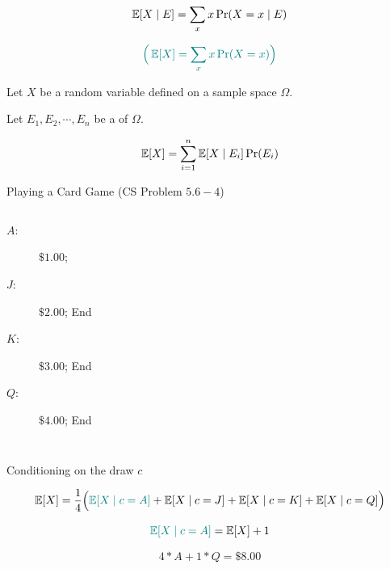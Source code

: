
\begin{frame}{}
  \begin{definition}
    \[
      \operatorname*{\mathbb{E}}[X \mid E] = \sum_{x} x \Pr(X = x \mid E)
    \]

    \[
      \textcolor{teal}{\Big(\operatorname*{\mathbb{E}}[X] = \sum_{x} x \Pr(X = x)\Big)}
    \]
  \end{definition}
\end{frame}

\begin{frame}{}
  \begin{theorem}
    Let $X$ be a random variable defined on a sample space $\Omega$.

    Let $E_1, E_2, \cdots, E_n$ be a  of $\Omega$.

    \[
      \operatorname*{\mathbb{E}}[X] = \sum_{i=1}^{n} \operatorname*{\mathbb{E}}[X \mid E_i] \Pr(E_i)
    \]
  \end{theorem}

  \vspace{0.50cm}
\end{frame}

\begin{frame}{}
  \begin{exampleblock}{ Playing a Card Game (CS Problem $5.6-4$)}
    \begin{columns}
	\begin{description}
	  \item[$A:$] $\$ 1.00$; 
	  \item[$J:$] $\$ 2.00$; End
	  \item[$K:$] $\$ 3.00$; End
	  \item[$Q:$] $\$ 4.00$; End
	\end{description}
    \end{columns}
  \end{exampleblock}

  \pause
  \centerline{Conditioning on the  draw $c$}
  \vspace{-0.40cm}
  \[
    \operatorname*{\mathbb{E}}[X] = \frac{1}{4}\Big(\textcolor{teal}{\operatorname*{\mathbb{E}}[X \mid c = A]} + \operatorname*{\mathbb{E}}[X \mid c = J] + \operatorname*{\mathbb{E}}[X \mid c = K] + \operatorname*{\mathbb{E}}[X \mid c = Q]\Big)
  \]

  \pause
  \vspace{-0.40cm}
  \[
    \textcolor{teal}{\operatorname*{\mathbb{E}}[X \mid c = A]} = \operatorname*{\mathbb{E}}[X] + 1
  \]

  \pause
  \[
    4 \ast A + 1 \ast Q = \$ 8.00
  \]
\end{frame}

